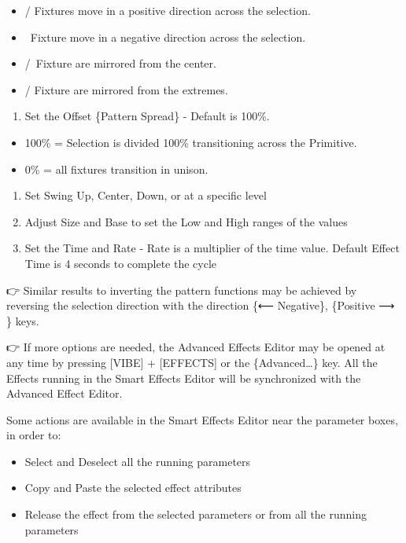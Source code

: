 \documentclass[
]{article}
\providecommand{\tightlist}{%
  \setlength{\itemsep}{0pt}\setlength{\parskip}{0pt}}
\begin{document}
\begin{itemize}
\item
  / Fixtures move in a positive direction across the selection.
\item
  ~Fixture move in a negative direction across the selection.
\item
  /~Fixture are mirrored from the center.
\item
  / Fixture are mirrored from the extremes.
\end{itemize}

\begin{enumerate}
\def\labelenumi{\arabic{enumi}.}
\setcounter{enumi}{6}
\tightlist
\item
  Set the Offset \{Pattern Spread\} - Default is 100\%.
\end{enumerate}

\begin{itemize}
\item
  100\% = Selection is divided 100\% transitioning across the Primitive.
\item
  0\% = all fixtures transition in unison.
\end{itemize}

\begin{enumerate}
\def\labelenumi{\arabic{enumi}.}
\setcounter{enumi}{7}
\item
  Set Swing Up, Center, Down, or at a specific level
\item
  Adjust Size and Base to set the Low and High ranges of the values
\item
  Set the Time and Rate - Rate is a multiplier of the time value. Default Effect Time is 4 seconds to complete the cycle
\end{enumerate}

👉 Similar results to inverting the pattern functions may be achieved by reversing the selection direction with the direction \{⟵ Negative\}, \{Positive ⟶ \} keys.

👉 If more options are needed, the Advanced Effects Editor may be opened at any time by pressing {[}VIBE{]} + {[}EFFECTS{]} or the \{Advanced\ldots\} key. All the Effects running in the Smart Effects Editor will be synchronized with the Advanced Effect Editor.

Some actions are available in the Smart Effects Editor near the parameter boxes, in order to:

\begin{itemize}
\item
  Select and Deselect all the running parameters
\item
  Copy and Paste the selected effect attributes
\item
  Release the effect from the selected parameters or from all the running parameters
\end{itemize}
\end{document}
